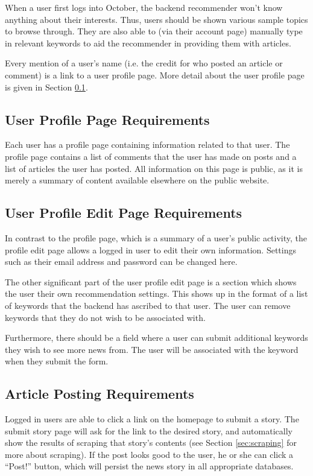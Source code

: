 \documentclass[11pt,letterpaper]{article}
\begin{document}
When a user first logs into October, the backend recommender won't know anything about their interests.
Thus, users should be shown various sample topics to browse through. 
They are also able to (via their account page) manually type in relevant keywords to aid the recommender in providing them with articles. 

Every mention of a user's name (i.e. the credit for who posted an article or comment) is a link to a user profile page. More detail about the user profile page is given in Section \ref{sec:profilepage}.

\subsection{User Profile Page Requirements}
\label{sec:profilepage}
Each user has a profile page containing information related to that user.
The profile page contains a list of comments that the user has made on posts and a list of articles the user has posted.
All information on this page is public, as it is merely a summary of content available elsewhere on the public website.

\subsection{User Profile Edit Page Requirements}
In contrast to the profile page, which is a summary of a user's public activity, the profile edit page allows a logged in user to edit their own information.
Settings such as their email address and password can be changed here.

The other significant part of the user profile edit page is a section which shows the user their own recommendation settings.
This shows up in the format of a list of keywords that the backend has ascribed to that user.
The user can remove keywords that they do not wish to be associated with.

Furthermore, there should be a field where a user can submit additional keywords they wish to see more news from.
The user will be associated with the keyword when they submit the form.

\subsection{Article Posting Requirements}
Logged in users are able to click a link on the homepage to submit a story.
The submit story page will ask for the link to the desired story, and automatically show the results of scraping that story's contents (see Section \ref{sec:scraping} for more about scraping).
If the post looks good to the user, he or she can click a ``Post!'' button, which will persist the news story in all appropriate databases.
\end{document}
